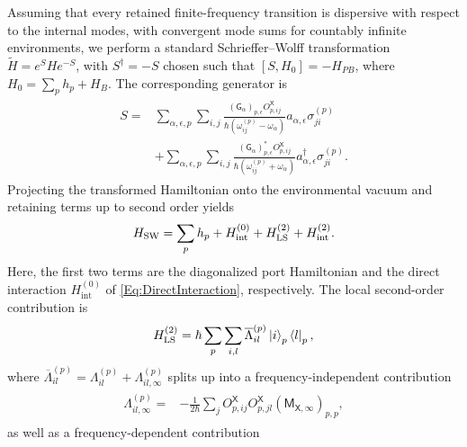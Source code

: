 \documentclass[prx,aps,twocolumn,article]{revtex4-2}
\newcommand{\msf}[1]{\mathsf{#1}}
\newcommand{\msG}{\msf{G}}
\newcommand{\msM}{\msf{M}}
\newcommand{\msX}{\msf{X}}
\begin{document}
Assuming that every retained finite-frequency transition is dispersive with respect to the internal modes, with convergent mode sums for countably infinite environments, we perform a standard Schrieffer--Wolff transformation $\tilde{H}=e^{S}He^{-S}$, with $S^\dagger=-S$ chosen such that
$[S,H_0]=-H_{PB}$, where $H_0=\sum_p h_p+H_B$. The corresponding generator is
\begin{align}
\begin{aligned}
    S
    ={}&
    \sum_{\alpha,\epsilon,p}
    \sum_{i,j}
    \frac{
        (\msG_\alpha)_{p,\epsilon}
        O_{p,ij}^{\msX}
    }{
        \hbar
        \left(
            \omega_{ij}^{(p)}-\omega_\alpha
        \right)
    }
    a_{\alpha,\epsilon}
    \sigma_{ji}^{(p)}
    \\
    &+
    \sum_{\alpha,\epsilon,p}
    \sum_{i,j}
    \frac{
        (\msG_\alpha)_{p,\epsilon}^*
        O_{p,ij}^{\msX}
    }{
        \hbar
        \left(
            \omega_{ij}^{(p)}+\omega_\alpha
        \right)
    }
    a_{\alpha,\epsilon}^\dagger
    \sigma_{ji}^{(p)}.
\end{aligned}
\label{Eq:DiscreteSWGeneratorMain}
\end{align}
Projecting the transformed Hamiltonian onto the environmental vacuum and retaining terms up to second order yields
\begin{align}
    {H}_{\mathrm {SW}} = \sum_p h_p + H_{\mathrm{int}}^{(0)}  + H_{\rm LS}^{(2)} + H_{\rm int}^{(2)}.
\label{Eq:DiscreteEffectiveHamiltonianMain}
\end{align}
Here, the first two terms are the diagonalized port Hamiltonian and the direct interaction $H_{\mathrm{int}}^{(0)}$ of \cref{Eq:DirectInteraction}, respectively. 
The local second-order contribution is
\begin{align}
    H_{\rm LS}^{(2)}
    =
    \hbar
    \sum_p
    \sum_{i,l}
    \overline{\Lambda}_{il}^{(p)}
    \ket{i}_p\bra{l}_p,
\label{Eq:DiscreteLambShiftMain}
\end{align}
where $\overline{\Lambda}_{il}^{(p)}=\Lambda_{il}^{(p)}+\Lambda_{il,\infty}^{(p)}$ splits up into a frequency-independent contribution
\begin{align}
\begin{aligned}
    \Lambda_{il,\infty}^{(p)}
    ={}&
    -\frac{1}{2\hbar}
    \sum_j
    O_{p,ij}^{\msX}
    O_{p,jl}^{\msX}(\msM_{\msX,\infty})_{p,p},
\end{aligned}
\label{Eq:DiscreteStaticLambShiftCoefficientMain}
\end{align}
as well as a frequency-dependent contribution
\end{document}
